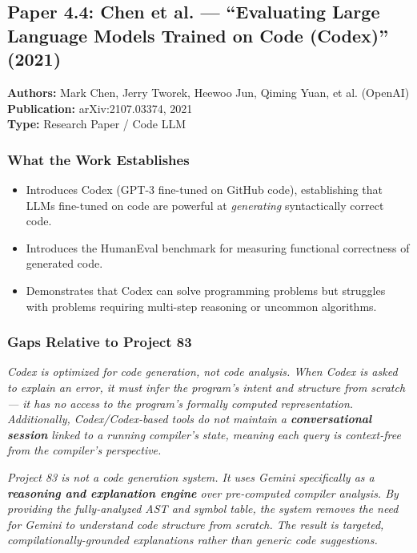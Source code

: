 \documentclass[a4paper,11pt]{article}
\newcommand{\papergap}[1]{%
  \begin{tcolorbox}[colback=red!5!white, colframe=red!60!black, title={Research Gap Identified}]
  \textit{#1}
  \end{tcolorbox}
}
\newcommand{\oursolution}[1]{%
  \begin{tcolorbox}[colback=green!5!white, colframe=green!60!black, title={How Project 83 Solves This Gap}]
  \textit{#1}
  \end{tcolorbox}
}
\begin{document}
\subsection{Paper 4.4: Chen et al. --- ``Evaluating Large Language Models Trained on Code (Codex)'' (2021)}

\begin{tcolorbox}[colback=gray!5, colframe=gray!40]
\textbf{Authors:} Mark Chen, Jerry Tworek, Heewoo Jun, Qiming Yuan, et al. (OpenAI) \\
\textbf{Publication:} arXiv:2107.03374, 2021 \\
\textbf{Type:} Research Paper / Code LLM
\end{tcolorbox}

\subsubsection{What the Work Establishes}

\begin{itemize}
    \item Introduces Codex (GPT-3 fine-tuned on GitHub code), establishing that LLMs fine-tuned on code are powerful at \textit{generating} syntactically correct code.
    \item Introduces the HumanEval benchmark for measuring functional correctness of generated code.
    \item Demonstrates that Codex can solve programming problems but struggles with problems requiring multi-step reasoning or uncommon algorithms.
\end{itemize}

\subsubsection{Gaps Relative to Project 83}

\papergap{Codex is optimized for code \textit{generation}, not code \textit{analysis}. When Codex is asked to explain an error, it must infer the program's intent and structure from scratch --- it has no access to the program's formally computed representation. Additionally, Codex/Codex-based tools do not maintain a \textbf{conversational session} linked to a running compiler's state, meaning each query is context-free from the compiler's perspective.}

\oursolution{Project 83 is not a code generation system. It uses Gemini specifically as a \textbf{reasoning and explanation engine} over pre-computed compiler analysis. By providing the fully-analyzed AST and symbol table, the system removes the need for Gemini to understand code structure from scratch. The result is targeted, compilationally-grounded explanations rather than generic code suggestions.}
\end{document}
